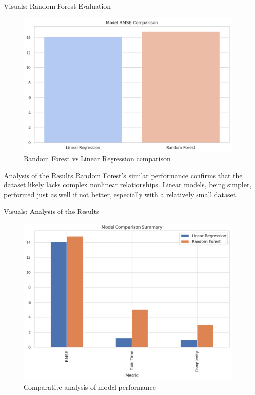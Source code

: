 \documentclass{beamer}
\begin{document}
\begin{frame}{Visuals: Random Forest Evaluation}
  \begin{figure}
    \includegraphics[width=0.9\linewidth]{random_forest_performance.png}
    \caption{Random Forest vs Linear Regression comparison}
  \end{figure}
\end{frame}

\begin{frame}{Analysis of the Results}
  Random Forest's similar performance confirms that the dataset likely lacks complex nonlinear relationships. Linear models, being simpler, performed just as well if not better, especially with a relatively small dataset.
\end{frame}

\begin{frame}{Visuals: Analysis of the Results}
  \begin{figure}
    \includegraphics[width=0.9\linewidth]{model_comparison_chart.png}
    \caption{Comparative analysis of model performance}
  \end{figure}
\end{frame}
\end{document}
